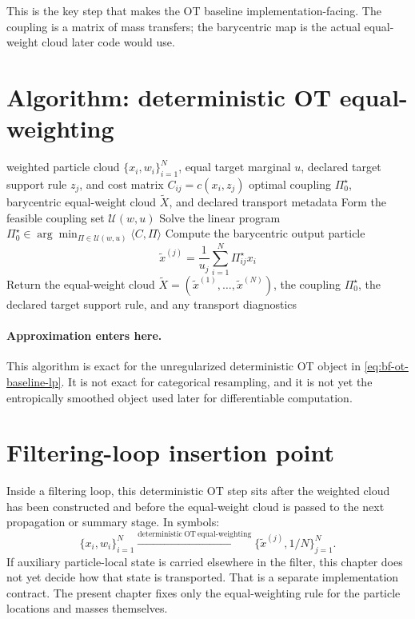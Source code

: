 This is the key step that makes the OT baseline implementation-facing.  The
coupling is a matrix of mass transfers; the barycentric map is the actual equal-
weight cloud later code would use.

\section{Algorithm: deterministic OT equal-weighting}
\label{sec:bf-ot-baseline-algorithm}

\begin{algorithm}[ht]
\caption{\texttt{deterministic\_ot\_equalweight\_step}}
\begin{algorithmic}[1]
\Require weighted particle cloud \(\{x_i,w_i\}_{i=1}^N\), equal target marginal \(u\), declared target support rule \(z_j\), and cost matrix \(C_{ij}=c(x_i,z_j)\)
\Ensure optimal coupling \(\Pi_0^\star\), barycentric equal-weight cloud \(\widetilde X\), and declared transport metadata
\State Form the feasible coupling set \(\mathcal U(w,u)\)
\State Solve the linear program \(\Pi_0^\star\in\arg\min_{\Pi\in\mathcal U(w,u)} \langle C,\Pi\rangle\)
  \State Compute the barycentric output particle
  \[
    \tilde x^{(j)} = \frac{1}{u_j}\sum_{i=1}^N \Pi_{ij}^\star x_i
  \]
\EndFor
\State Return the equal-weight cloud \(\widetilde X=(\tilde x^{(1)},\ldots,\tilde x^{(N)})\), the coupling \(\Pi_0^\star\), the declared target support rule, and any transport diagnostics
\end{algorithmic}
\end{algorithm}

\paragraph{Approximation enters here.}
This algorithm is exact for the unregularized deterministic OT object in
\eqref{eq:bf-ot-baseline-lp}.  It is not exact for categorical resampling, and it
is not yet the entropically smoothed object used later for differentiable
computation.

\section{Filtering-loop insertion point}
\label{sec:bf-ot-baseline-loop}

Inside a filtering loop, this deterministic OT step sits after the weighted cloud
has been constructed and before the equal-weight cloud is passed to the next
propagation or summary stage.  In symbols:
\begin{equation}
\label{eq:bf-ot-baseline-loop}
  \{x_i,w_i\}_{i=1}^N
  \xrightarrow{\mathrm{deterministic\ OT\ equal\text{-}weighting}}
  \{\tilde x^{(j)},1/N\}_{j=1}^N.
\end{equation}
If auxiliary particle-local state is carried elsewhere in the filter, this chapter
does not yet decide how that state is transported.  That is a separate
implementation contract.  The present chapter fixes only the equal-weighting rule
for the particle locations and masses themselves.

